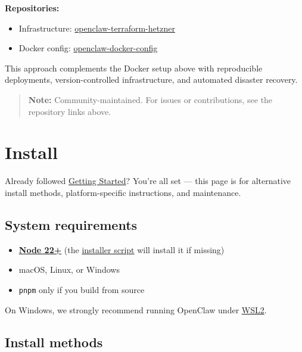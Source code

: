 \textbf{Repositories:}

\begin{itemize}
  \item Infrastructure: \href{https://github.com/andreesg/openclaw-terraform-hetzner}{openclaw-terraform-hetzner}
  \item Docker config: \href{https://github.com/andreesg/openclaw-docker-config}{openclaw-docker-config}
\end{itemize}


This approach complements the Docker setup above with reproducible deployments, version-controlled infrastructure, and automated disaster recovery.

\begin{quote}
\textbf{Note:} Community-maintained. For issues or contributions, see the repository links above.
\end{quote}



\clearpage

\section{Install}


Already followed \href{/start/getting-started}{Getting Started}? You're all set — this page is for alternative install methods, platform-specific instructions, and maintenance.

\subsection{System requirements}


\begin{itemize}
  \item \textbf{\href{/install/node}{Node 22+}} (the \href{\#install-methods}{installer script} will install it if missing)
  \item macOS, Linux, or Windows
  \item \texttt{pnpm} only if you build from source
\end{itemize}


On Windows, we strongly recommend running OpenClaw under \href{https://learn.microsoft.com/en-us/windows/wsl/install}{WSL2}.

\subsection{Install methods}


